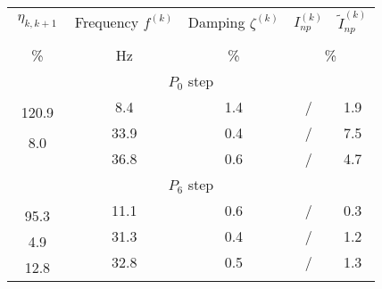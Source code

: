 \documentclass[11pt]{article}
\begin{document}
\begin{table}
\centering
\begin{tabular}{|ccccc|}
\hline
\multicolumn{1}{|c|}{\multirow{2.5}{*}{$\ \eta_{k, k+1}\ $}} & 
\multicolumn{1}{c|}{\multirow{2.5}{*}{Frequency $f^{(k)}$}} & 
\multicolumn{1}{c|}{\multirow{2.5}{*}{Damping $\zeta^{(k)}$}} & 
\multicolumn{1}{c}{\multirow{2.5}{*}{$I_{np}^{(k)}$}} & 
\multirow{2.5}{*}{$\tilde I_{np}^{(k)}$} \\
\multicolumn{1}{|c|}{} & \multicolumn{1}{c|}{} & \multicolumn{1}{c|}{} & \multicolumn{2}{c|}{} \\
\multicolumn{1}{|c|}{\multirow{2}{*}{\%}} & 
\multicolumn{1}{c|}{\multirow{2}{*}{Hz}} & 
\multicolumn{1}{c|}{\multirow{2}{*}{\%}} & 
\multicolumn{2}{c|}{\multirow{2}{*}{\%}} \\
\multicolumn{1}{|c|}{} & \multicolumn{1}{c|}{} & \multicolumn{1}{c|}{} & & \\ \hline \hline
\multicolumn{5}{|c|}{\multirow{2}{*}{$P_0$ step}} \\
\multicolumn{5}{|c|}{} \\ \hline
 & \multirow{2}{*}{8.4} & \multirow{2}{*}{1.4} & \multirow{2}{*}{/} & \multirow{2}{*}{1.9} \\ %
\multirow{2}{*}{120.9} & & & & \\ \cline{2-5} 
 & \multirow{2}{*}{33.9} & \multirow{2}{*}{0.4} & \multirow{2}{*}{/} & \multirow{2}{*}{7.5} \\ %
\multirow{2}{*}{8.0} & & & & \\ \cline{2-5} 
 & \multirow{2}{*}{36.8} & \multirow{2}{*}{0.6} & \multirow{2}{*}{/} & \multirow{2}{*}{4.7} \\ %
 & & & & \\ \hline \hline
\multicolumn{5}{|c|}{\multirow{2}{*}{$P_6$ step}} \\
\multicolumn{5}{|c|}{} \\ \hline
 & \multirow{2}{*}{11.1} & \multirow{2}{*}{0.6} & \multirow{2}{*}{/} & \multirow{2}{*}{0.3} \\ %
\multirow{2}{*}{95.3} & & & & \\ \cline{2-5} 
 & \multirow{2}{*}{31.3} & \multirow{2}{*}{0.4} & \multirow{2}{*}{/} & \multirow{2}{*}{1.2} \\ %
\multirow{2}{*}{4.9} & & & & \\ \cline{2-5} 
 & \multirow{2}{*}{32.8} & \multirow{2}{*}{0.5} & \multirow{2}{*}{/} & \multirow{2}{*}{1.3} \\ %
\multirow{2}{*}{12.8} & & & & \\ \cline{2-5} 

\end{tabular}
\end{table}
\end{document}
